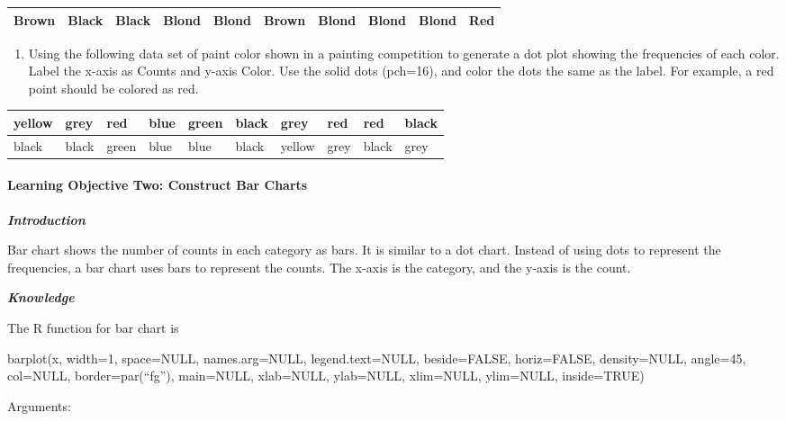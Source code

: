 \begin{longtable}[]{@{}llllllllll@{}}
\toprule
\endhead
Brown & Black & Black & Blond & Blond & Brown & Blond & Blond & Blond &
Red\tabularnewline
\bottomrule
\end{longtable}

\begin{enumerate}
\def\labelenumi{\arabic{enumi}.}
\setcounter{enumi}{1}
\item
  Using the following data set of paint color shown in a painting
  competition to generate a dot plot showing the frequencies of each
  color. Label the x-axis as Counts and y-axis Color. Use the solid dots
  (pch=16), and color the dots the same as the label. For example, a red
  point should be colored as red.
\end{enumerate}

\begin{longtable}[]{@{}llllllllll@{}}
\toprule
yellow & grey & red & blue & green & black & grey & red & red &
black\tabularnewline
\midrule
\endhead
black & black & green & blue & blue & black & yellow & grey & black &
grey\tabularnewline
\bottomrule
\end{longtable}

\hypertarget{learning-objective-two-construct-bar-charts}{%
\paragraph{Learning Objective Two: Construct Bar
Charts}\label{learning-objective-two-construct-bar-charts}}

\emph{\textbf{Introduction}}

Bar chart shows the number of counts in each category as bars. It is
similar to a dot chart. Instead of using dots to represent the
frequencies, a bar chart uses bars to represent the counts. The x-axis
is the category, and the y-axis is the count.

\emph{\textbf{Knowledge}}

The R function for bar chart is

barplot(x, width=1, space=NULL, names.arg=NULL, legend.text=NULL,
beside=FALSE, horiz=FALSE, density=NULL, angle=45, col=NULL,
border=par(``fg''), main=NULL, xlab=NULL, ylab=NULL, xlim=NULL,
ylim=NULL, inside=TRUE)

Arguments:

